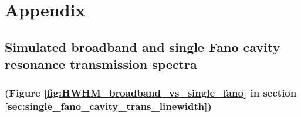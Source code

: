 \appendix
\section*{Appendix}
\renewcommand{\thesubsection}{\Alph{subsection}}

\subsection{Simulated broadband and single Fano cavity resonance transmission spectra}

\subsubsection*{(Figure \ref{fig:HWHM_broadband_vs_single_fano} in section \ref{sec:single_fano_cavity_trans_linewidth})}

